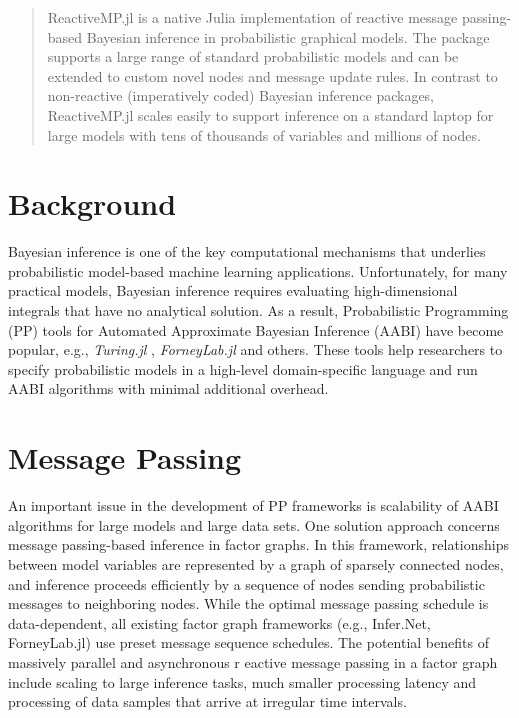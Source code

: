 \documentclass{juliacon}
\begin{document}


\maketitle

\begin{abstract}

ReactiveMP.jl is a native Julia implementation of reactive message passing-based Bayesian inference in probabilistic graphical models. 
The package supports a large range of standard probabilistic models and can be extended to custom novel nodes and message update rules. 
In contrast to non-reactive (imperatively coded) Bayesian inference packages, ReactiveMP.jl scales easily to support inference on a standard laptop 
for large models with tens of thousands of variables and millions of nodes.

\end{abstract}

\section{Background}

Bayesian inference is one of the key computational mechanisms that underlies probabilistic model-based machine learning applications. 
Unfortunately, for many practical models, Bayesian inference requires evaluating high-dimensional integrals that have no analytical solution. 
As a result, Probabilistic Programming (PP) tools for Automated Approximate Bayesian Inference (AABI) have become popular, e.g., \textit{Turing.jl} \cite{ge2018t}, 
\textit{ForneyLab.jl} \cite{ForneyLab.jl-2019} and others. These tools help researchers to specify probabilistic models in a high-level domain-specific language and 
run AABI algorithms with minimal additional overhead. 

\section{Message Passing}

An important issue in the development of PP frameworks is scalability of AABI algorithms for large models and large data sets. 
One solution approach concerns message passing-based inference in factor graphs. In this framework, relationships between model variables are represented by a graph of sparsely connected nodes, 
and inference proceeds efficiently by a sequence of nodes sending probabilistic messages to neighboring nodes. While the optimal message passing schedule is data-dependent, 
all existing factor graph frameworks (e.g., Infer.Net, ForneyLab.jl) use preset message sequence schedules. The potential benefits of massively parallel and asynchronous r
eactive message passing in a factor graph include scaling to large inference tasks, much smaller processing latency and processing of data samples that arrive at irregular time intervals.
\end{document}
